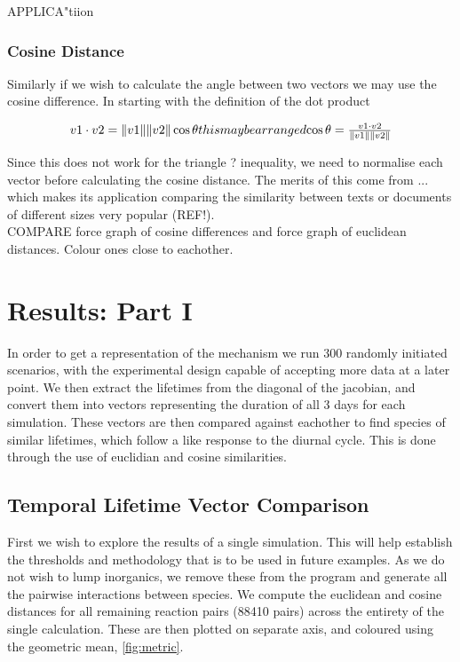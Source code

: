 APPLICA"tiion

\subsubsection{Cosine Distance} 

Similarly if we wish to calculate the angle between two vectors we may use the cosine difference. In starting with the definition of the dot product 

\begin{equation}
v1 \cdot v2 = \|v1\|\|v2\| \cos \theta
$$this may be arranged$$
\cos \theta = \frac{ v1 \cdot v2}{\|v1\|\|v2\|}
\end{equation}

Since this does not work for the triangle ? inequality, we need to normalise each vector before calculating the cosine distance. The merits of this come from  ... which makes its application comparing the similarity between texts or documents of different sizes very popular (REF!). \\


COMPARE force graph of cosine differences and force graph of euclidean distances. Colour ones close to eachother. \\



\section{Results: Part I}

In order to get a representation of the mechanism we run 300 randomly initiated scenarios, with the experimental design capable of accepting more data at a later point. We then extract the lifetimes from the diagonal of the jacobian, and convert them into vectors representing the duration of all 3 days for each simulation. These vectors are then compared against eachother to find species of similar lifetimes, which follow a like response to the diurnal cycle. This is done through the use of euclidian and cosine similarities. 

\subsection{Temporal Lifetime Vector Comparison}
First we wish to explore the results of a single simulation. This will help establish the thresholds and methodology that is to be used in future examples. As we do not wish to lump inorganics, we remove these from the program and generate all the pairwise interactions between species. We compute the euclidean and cosine distances for all remaining reaction pairs (88410 pairs) across the entirety of the single calculation. These are then plotted on separate axis, and coloured using the geometric mean, \autoref{fig:metric}. \\

